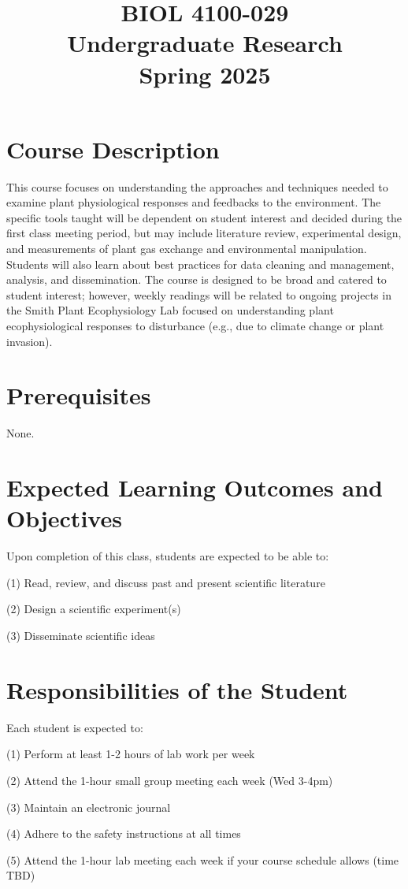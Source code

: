 \documentclass[12pt, notitlepage]{article}   	%
\title{
	\textbf{
		BIOL 4100-029
	} \\
	\large Undergraduate Research \\
	\large Spring 2025
}
\date{\vspace{-5ex}}
\begin{document}
{\selectfont %

\maketitle

\section{Course Description}
This course focuses on understanding the approaches and techniques needed to examine plant physiological responses and feedbacks to the environment. The specific tools taught will be dependent on student interest and decided during the first class meeting period, but may include literature review, experimental design, and measurements of plant gas exchange and environmental manipulation. Students will also learn about best practices for data cleaning and management, analysis, and dissemination. The course is designed to be broad and catered to student interest; however, weekly readings will be related to ongoing projects in the Smith Plant Ecophysiology Lab focused on understanding plant ecophysiological responses to disturbance (e.g., due to climate change or plant invasion). 

\section{Prerequisites}
None.

\section{Expected Learning Outcomes and Objectives}
Upon completion of this class, students are expected to be able to:\par
(1)	Read, review, and discuss past and present scientific literature\par
(2) Design a scientific experiment(s)\par
(3) Disseminate scientific ideas\par

\section{Responsibilities of the Student}
Each student is expected to:\par
(1) Perform at least 1-2 hours of lab work per week\par
(2) Attend the 1-hour small group meeting each week (Wed 3-4pm)\par
(3) Maintain an electronic journal\par
(4) Adhere to the safety instructions at all times\par
(5) Attend the 1-hour lab meeting each week if your course schedule allows (time TBD)\par

}
\end{document}
